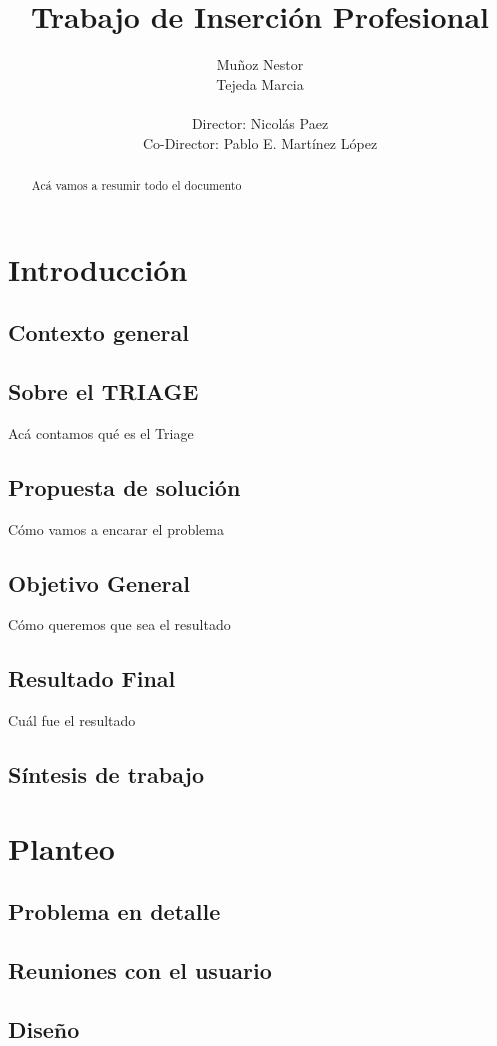 \documentclass[a4paper,10pt]{article}
\title{Trabajo de Inserción Profesional}
\author{Muñoz Nestor \\ Tejeda Marcia \\ \\ Director: Nicolás Paez \\  Co-Director: Pablo E. Martínez López}
\begin{document}
\maketitle
\newpage 
\begin{abstract}
Acá vamos a resumir todo el documento
\end{abstract}


\newpage 
\tableofcontents


\newpage 
\section{Introducción}
\subsection{Contexto general}
\subsection{Sobre el TRIAGE}
Acá contamos qué es el Triage

\subsection{Propuesta de solución}
Cómo vamos a encarar el problema
\subsection{Objetivo General}
Cómo queremos que sea el resultado
\subsection{Resultado Final}
Cuál fue el resultado
\subsection{Síntesis de trabajo}

\newpage 
\section{Planteo}
\subsection{Problema en detalle}
\subsection{Reuniones con el usuario}
\subsection{Diseño}
\end{document}
